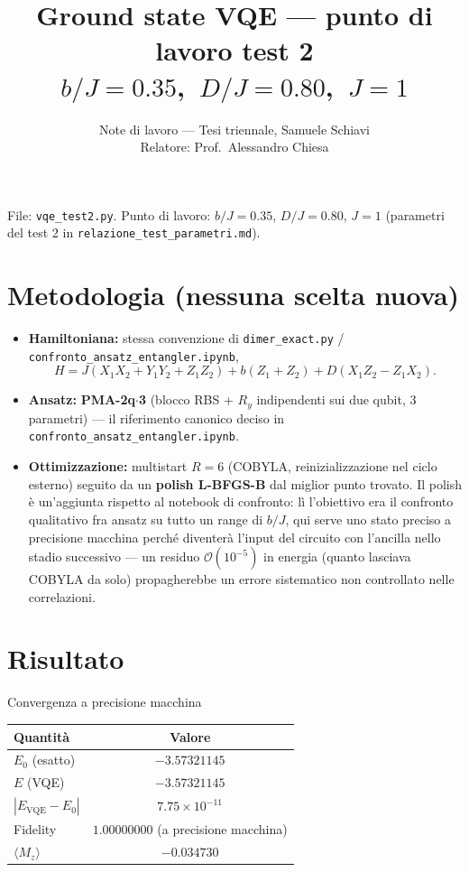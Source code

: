 \documentclass[11pt,a4paper]{article}
\title{\vspace{-1.5em}\color{inkblue}Ground state VQE --- punto di lavoro test 2\\[0.2em]
\Large\normalfont\color{softgray}$b/J=0.35$,\ $D/J=0.80$,\ $J=1$}
\author{Note di lavoro --- Tesi triennale, Samuele Schiavi\\ Relatore: Prof.\ Alessandro Chiesa}
\date{}
\begin{document}
\sloppy
\maketitle
\thispagestyle{fancy}
\vspace{-2.2em}

File: \texttt{vqe\_test2.py}. Punto di lavoro: $b/J=0.35$, $D/J=0.80$,
$J=1$ (parametri del test 2 in \texttt{relazione\_test\_parametri.md}).

\section*{Metodologia (nessuna scelta nuova)}

\begin{itemize}[leftmargin=1.3em,itemsep=0.25em]
\item \textbf{Hamiltoniana:} stessa convenzione di \texttt{dimer\_exact.py}
/ \texttt{confronto\_ansatz\_entangler.ipynb},
$$H=J(X_1X_2+Y_1Y_2+Z_1Z_2)+b(Z_1+Z_2)+D(X_1Z_2-Z_1X_2).$$
\item \textbf{Ansatz:} \textbf{PMA-2q$\cdot$3} (blocco RBS + $R_y$
indipendenti sui due qubit, 3 parametri) --- il riferimento canonico
deciso in \texttt{confronto\_ansatz\_entangler.ipynb}.
\item \textbf{Ottimizzazione:} multistart $R=6$ (COBYLA, reinizializzazione
nel ciclo esterno) seguito da un \textbf{polish L-BFGS-B} dal miglior
punto trovato. Il polish è un'aggiunta rispetto al notebook di confronto:
lì l'obiettivo era il confronto qualitativo fra ansatz su tutto un range
di $b/J$, qui serve uno stato preciso a precisione macchina perché
diventerà l'input del circuito con l'ancilla nello stadio successivo ---
un residuo $\mathcal O(10^{-5})$ in energia (quanto lasciava COBYLA da
solo) propagherebbe un errore sistematico non controllato nelle
correlazioni.
\end{itemize}

\section*{Risultato}

\begin{okbox}{Convergenza a precisione macchina}
\begin{center}
\renewcommand{\arraystretch}{1.25}
\begin{tabular}{@{}lc@{}}
\toprule
\textbf{Quantità} & \textbf{Valore}\\
\midrule
$E_0$ (esatto) & $-3.57321145$\\
$E$ (VQE) & $-3.57321145$\\
$|E_\text{VQE}-E_0|$ & $7.75\times10^{-11}$\\
Fidelity & $1.00000000$ (a precisione macchina)\\
$\langle M_z\rangle$ & $-0.034730$\\
\bottomrule
\end{tabular}
\end{center}
\end{okbox}
\end{document}
